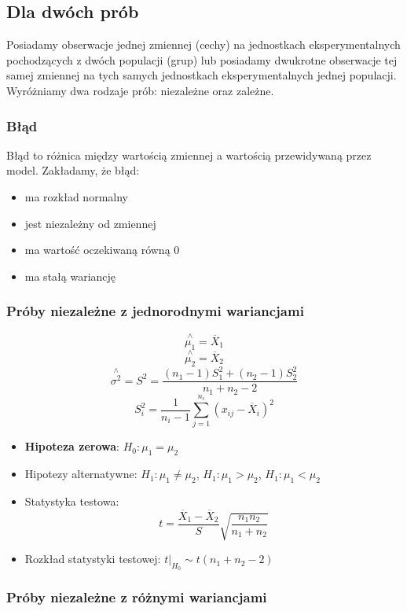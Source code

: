 \documentclass{../notatki}
\begin{document}
\subsection{Dla dwóch prób}

Posiadamy obserwacje jednej zmiennej (cechy) na jednostkach
eksperymentalnych pochodzących z dwóch populacji (grup) lub
posiadamy dwukrotne obserwacje tej samej zmiennej na tych samych
jednostkach eksperymentalnych jednej populacji. Wyróżniamy dwa
rodzaje prób: niezależne oraz zależne.

\subsubsection{Błąd}

Błąd to różnica między wartością zmiennej a wartością przewidywaną przez
model. Zakładamy, że błąd:
\begin{itemize}
  \item ma rozkład normalny
  \item jest niezależny od zmiennej
  \item ma wartość oczekiwaną równą 0
  \item ma stałą wariancję
\end{itemize}

\subsubsection{Próby niezależne z jednorodnymi wariancjami}

$$
\stackrel{\wedge}{\mu_1} = \overline{X}_1
$$
$$
\stackrel{\wedge}{\mu_2} = \overline{X}_2
$$
$$
\stackrel{\wedge}{\sigma^2} = S^2 = \frac{(n_1 - 1)S_1^2 + (n_2 -
1)S_2^2}{n_1 + n_2 - 2}
$$
$$
S_i^2 = \frac{1}{n_i - 1} \sum_{j=1}^{n_i} (x_{ij} - \overline{X}_i)^2
$$

\begin{itemize}
  \item \textbf{Hipoteza zerowa}: $H_0: \mu_1 = \mu_2$
  \item Hipotezy alternatywne: $H_1: \mu_1 \neq \mu_2$, $H_1: \mu_1 >
    \mu_2$, $H_1: \mu_1 < \mu_2$
  \item Statystyka testowa:
    $$
    t = \frac{\overline{X}_1 - \overline{X}_2}{S}
    \sqrt{\frac{n_1n_2}{n_1 + n_2}}
    $$
  \item Rozkład statystyki testowej: $t|_{H_0} \sim t(n_1 + n_2 - 2)$
\end{itemize}

\subsubsection{Próby niezależne z różnymi wariancjami}
\end{document}

